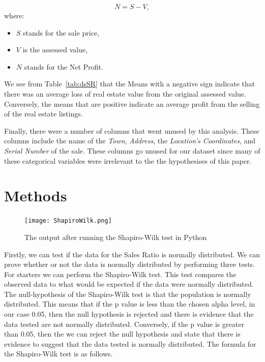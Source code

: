 \documentclass[12pt]{article}
\begin{document}
\begin{equation}
N = S - V,
\label{tab:eqProfit} 
\end{equation}
where:
\begin{itemize}
\item $S$ stands for the sale price,
\item $V$ is the assessed value,
\item $N$ stands for the Net Profit.
\end{itemize}

We see from Table~\ref{tab:dsSR} that the \textit{}{Means} with a negative sign indicate that there was an average loss of real estate value from the original assessed value. Conversely, the means that are positive indicate an average profit from the selling of the real estate listings.

Finally, there were a number of columns that went unused by this analysis. These columns include the name of the \textit{Town}, \textit{Address}, the \textit{Location's Coordinates}, and \textit{Serial Number} of the sale. These columns go unused for our dataset since many of these categorical variables were irrelevant to the the hypothesises of this paper. 


\section{Methods}
\label{sec:meth}

\begin{figure}[!t]
  \centering
  \texttt{[image: ShapiroWilk.png]}
  \caption{The output after running the Shapiro-Wilk test in Python}
  \label{fig:ShapiroWilk}
\end{figure}

Firstly, we can test if the data for the Sales Ratio is normally distributed. We can prove whether or not the data is normally distributed by performing three tests. For starters we can perform the Shapiro-Wilk test. This test compares the observed data to what would be expected if the data were normally distributed. The null-hypothesis of the Shapiro-Wilk test is that the population is normally distributed. This means that if the p value is less than the chosen alpha level, in our case 0.05, then the null hypothesis is rejected and there is evidence that the data tested are not normally distributed. Conversely, if the p value is greater than 0.05, then the we can reject the null hypothesis and state that there is evidence to suggest that the data tested is normally distributed. The formula for the Shapiro-Wilk test is as follows.
\end{document}

